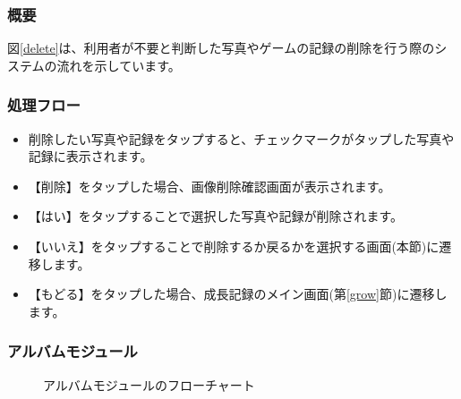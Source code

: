 \documentclass[a4j]{jarticle}
\begin{document}
\subsubsection*{概要}
図\ref{delete}は、利用者が不要と判断した写真やゲームの記録の削除を行う際のシステムの流れを示しています。

\subsubsection*{処理フロー}
\begin{itemize}
\item 削除したい写真や記録をタップすると、チェックマークがタップした写真や記録に表示されます。
\item 【削除】をタップした場合、画像削除確認画面が表示されます。
\item 【はい】をタップすることで選択した写真や記録が削除されます。
\item 【いいえ】をタップすることで削除するか戻るかを選択する画面(本節)に遷移します。
\item 【もどる】をタップした場合、成長記録のメイン画面(第\ref{grow}節)に遷移します。
\end{itemize}

\subsubsection{アルバムモジュール\label{Albam}}
\begin{figure}[H]
    \begin{center}
    \caption {アルバムモジュールのフローチャート}
    \label{albam}
    \end{center}
\end{figure}
\end{document}
